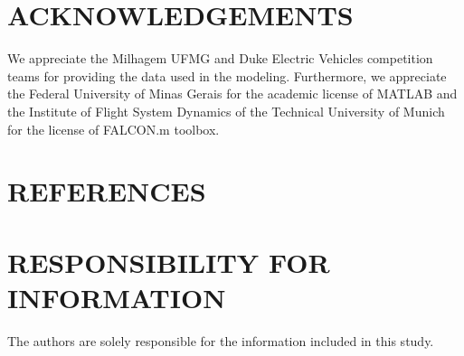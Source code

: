 \documentclass[10pt,fleqn,a4paper,twoside]{article}
\begin{document}






\section{ACKNOWLEDGEMENTS}
We appreciate the Milhagem UFMG and Duke Electric Vehicles competition teams for providing the data used in the modeling. 
Furthermore, we appreciate the Federal University of Minas Gerais for the academic license of MATLAB and the Institute of Flight System Dynamics of the Technical University of Munich for the license of FALCON.m toolbox.

\section{REFERENCES} 


\renewcommand{\refname}{}


\section{RESPONSIBILITY FOR INFORMATION}

The authors are solely responsible for the information included in this study.
\end{document}
